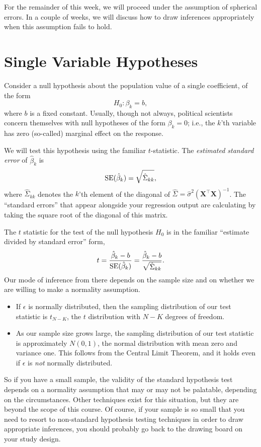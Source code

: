 \documentclass[12pt,oneside,openany]{book}
\begin{document}
For the remainder of this week, we will proceed under the assumption of
spherical errors. In a couple of weeks, we will discuss how to draw
inferences appropriately when this assumption fails to hold.

\section{Single Variable Hypotheses}\label{single-variable-hypotheses}

Consider a null hypothesis about the population value of a single
coefficient, of the form \[
H_0 : \beta_k = b,
\] where \(b\) is a fixed constant. Usually, though not always,
political scientists concern themselves with null hypotheses of the form
\(\beta_k = 0\); i.e., the \(k\)'th variable has zero (so-called)
marginal effect on the response.

We will test this hypothesis using the familiar \(t\)-statistic. The
\emph{estimated standard error} of \(\hat{\beta}_k\) is \[
\mathop{\rm SE}\nolimits(\hat{\beta}_k) = \sqrt{\hat{\Sigma}_{kk}},
\] where \(\hat{\Sigma}_{kk}\) denotes the \(k\)'th element of the
diagonal of
\(\hat{\Sigma} = \hat{\sigma}^2 (\mathbf{X}^\top \mathbf{X})^{-1}\). The
``standard errors'' that appear alongside your regression output are
calculating by taking the square root of the diagonal of this matrix.

The \(t\) statistic for the test of the null hypothesis \(H_0\) is in
the familiar ``estimate divided by standard error'' form, \[
t = \frac{\hat{\beta}_k - b}{\mathop{\rm SE}\nolimits(\hat{\beta}_k)} = \frac{\hat{\beta}_k - b}{\sqrt{\hat{\Sigma}_{kk}}}.
\] Our mode of inference from there depends on the sample size and on
whether we are willing to make a normality assumption.

\begin{itemize}
\item
  If \(\epsilon\) is normally distributed, then the sampling
  distribution of our test statistic is \(t_{N - K}\), the \(t\)
  distribution with \(N - K\) degrees of freedom.
\item
  As our sample size grows large, the sampling distribution of our test
  statistic is approximately \(N(0, 1)\), the normal distribution with
  mean zero and variance one. This follows from the Central Limit
  Theorem, and it holds even if \(\epsilon\) is \emph{not} normally
  distributed.
\end{itemize}

So if you have a small sample, the validity of the standard hypothesis
test depends on a normality assumption that may or may not be palatable,
depending on the circumstances. Other techniques exist for this
situation, but they are beyond the scope of this course. Of course, if
your sample is so small that you need to resort to non-standard
hypothesis testing techniques in order to draw appropriate inferences,
you should probably go back to the drawing board on your study design.
\end{document}
